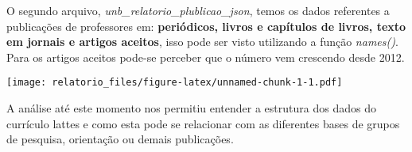 \documentclass[]{article}
\newenvironment{Shaded}{\begin{snugshade}}{\end{snugshade}}
\newcommand{\KeywordTok}[1]{\textcolor[rgb]{0.13,0.29,0.53}{\textbf{#1}}}
\newcommand{\StringTok}[1]{\textcolor[rgb]{0.31,0.60,0.02}{#1}}
\newcommand{\OperatorTok}[1]{\textcolor[rgb]{0.81,0.36,0.00}{\textbf{#1}}}
\newcommand{\NormalTok}[1]{#1}
\begin{document}
O segundo arquivo, \emph{unb\_relatorio\_plublicao\_json}, temos os
dados referentes a publicações de professores em: \textbf{periódicos,
livros e capítulos de livros, texto em jornais e artigos aceitos}, isso
pode ser visto utilizando a função \emph{names()}. Para os artigos
aceitos pode-se perceber que o número vem crescendo desde 2012.

\begin{Shaded}
\end{Shaded}

\texttt{[image: relatorio\_files/figure-latex/unnamed-chunk-1-1.pdf]}

A análise até este momento nos permitiu entender a estrutura dos dados
do currículo lattes e como esta pode se relacionar com as diferentes
bases de grupos de pesquisa, orientação ou demais publicações.
\end{document}
